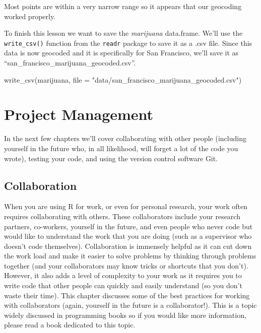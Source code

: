 \documentclass[
]{krantz}
\makeatletter
\newenvironment{Shaded}{\begin{snugshade}}{\end{snugshade}}
\newcommand{\AttributeTok}[1]{\textcolor[rgb]{0.61,0.61,0.61}{#1}}
\newcommand{\FunctionTok}[1]{\textcolor[rgb]{0,0,0}{#1}}
\newcommand{\NormalTok}[1]{#1}
\newcommand{\StringTok}[1]{\textcolor[rgb]{0.5,0.5,0.5}{#1}}
\newenvironment{kframe}{%
\medskip{}
\setlength{\fboxsep}{.8em}
 \def\at@end@of@kframe{}%
 \ifinner\ifhmode%
  \def\at@end@of@kframe{\end{minipage}}%
  \begin{minipage}{\columnwidth}%
 \fi\fi%
 \def\FrameCommand##1{\hskip\@totalleftmargin \hskip-\fboxsep
 \colorbox{shadecolor}{##1}\hskip-\fboxsep
     \hskip-\linewidth \hskip-\@totalleftmargin \hskip\columnwidth}%
 \MakeFramed {\advance\hsize-\width
   \@totalleftmargin\z@ \linewidth\hsize
   \@setminipage}}%
 {\par\unskip\endMakeFramed%
 \at@end@of@kframe}
\renewenvironment{Shaded}{\begin{kframe}}{\end{kframe}}
\makeatother
\begin{document}
Most points are within a very narrow range so it appears that our geocoding worked properly.

To finish this lesson we want to save the \emph{marijuana} data.frame. We'll use the \texttt{write\_csv()} function from the \texttt{readr} package to save it as a .csv file. Since this data is now geocoded and it is specifically for San Francisco, we'll save it as ``san\_francisco\_marijuana\_geocoded.csv''.

\begin{Shaded}
\begin{Highlighting}[]
\FunctionTok{write\_csv}\NormalTok{(marijuana, }\AttributeTok{file =} \StringTok{"data/san\_francisco\_marijuana\_geocoded.csv"}\NormalTok{)}
\end{Highlighting}
\end{Shaded}

\hypertarget{part-project-management}{%
\part{Project Management}\label{part-project-management}}

In the next few chapters we'll cover collaborating with other people (including yourself in the future who, in all likelihood, will forget a lot of the code you wrote), testing your code, and using the version control software Git.

\hypertarget{collaboration}{%
\chapter{Collaboration}\label{collaboration}}

When you are using R for work, or even for personal research, your work often requires collaborating with others. These collaborators include your research partners, co-workers, yourself in the future, and even people who never code but would like to understand the work that you are doing (such as a supervisor who doesn't code themselves). Collaboration is immensely helpful as it can cut down the work load and make it easier to solve problems by thinking through problems together (and your collaborators may know tricks or shortcuts that you don't). However, it also adds a level of complexity to your work as it requires you to write code that other people can quickly and easily understand (so you don't waste their time). This chapter discusses some of the best practices for working with collaborators (again, yourself in the future is a collaborator!). This is a topic widely discussed in programming books so if you would like more information, please read a book dedicated to this topic.
\end{document}
